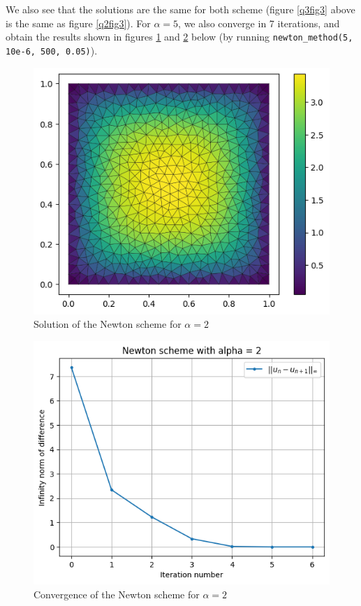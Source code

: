 \documentclass[11pt, a4paper, twoside]{article}
\begin{document}
We also see that the solutions are the same for both scheme (figure \ref{q3fig3} above is the same as figure \ref{q2fig3}).
For $\alpha=5$, we also converge in 7 iterations, and obtain the results shown in figures \ref{q3fig5} and \ref{q3fig6} below (by running \verb+newton_method(5, 10e-6, 500, 0.05)+).

\begin{figure}[H]
\centering
\includegraphics[scale = 0.7]{../Figures/newt_sol_alpha2.png}
\caption{Solution of the Newton scheme for $\alpha=2$}
\label{q3fig5}
\end{figure}

\begin{figure}[H]
\centering
\includegraphics[scale = 0.7]{../Figures/newt_conv_alpha2.png}
\caption{Convergence of the Newton scheme for $\alpha=2$}
\label{q3fig6}
\end{figure}
\end{document}
